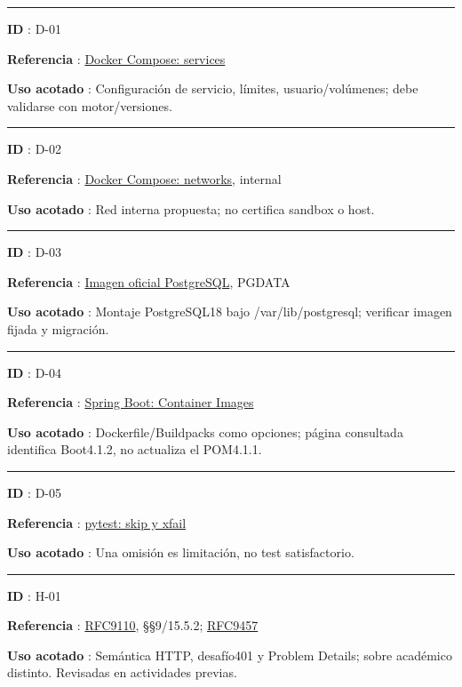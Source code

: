 \documentclass[12pt,a4paper]{report}
\begin{document}
\medskip\hrule\medskip

\textbf{ID }: D-01

\textbf{Referencia
}: \href{https://docs.docker.com/reference/compose-file/services/}{Docker
Compose: services}

\textbf{Uso acotado }: Configuración de servicio, límites,
usuario/volúmenes; debe validarse con motor/versiones.

\medskip\hrule\medskip

\textbf{ID }: D-02

\textbf{Referencia
}: \href{https://docs.docker.com/reference/compose-file/networks/}{Docker
Compose: networks}, internal

\textbf{Uso acotado }: Red interna propuesta; no certifica sandbox o
host.

\medskip\hrule\medskip

\textbf{ID }: D-03

\textbf{Referencia
}: \href{https://raw.githubusercontent.com/docker-library/docs/master/postgres/README.md}{Imagen
oficial PostgreSQL}, PGDATA

\textbf{Uso acotado }: Montaje PostgreSQL18 bajo /var/lib/postgresql;
verificar imagen fijada y migración.

\medskip\hrule\medskip

\textbf{ID }: D-04

\textbf{Referencia
}: \href{https://docs.spring.io/spring-boot/reference/packaging/container-images/index.html}{Spring
Boot: Container Images}

\textbf{Uso acotado }: Dockerfile/Buildpacks como opciones; página
consultada identifica Boot4.1.2, no actualiza el POM4.1.1.

\medskip\hrule\medskip

\textbf{ID }: D-05

\textbf{Referencia
}: \href{https://docs.pytest.org/en/stable/how-to/skipping.html}{pytest:
skip y xfail}

\textbf{Uso acotado }: Una omisión es limitación, no test satisfactorio.

\medskip\hrule\medskip

\textbf{ID }: H-01

\textbf{Referencia
}: \href{https://www.rfc-editor.org/rfc/rfc9110.html}{RFC9110},
§§9/15.5.2; \href{https://www.rfc-editor.org/rfc/rfc9457.html}{RFC9457}

\textbf{Uso acotado }: Semántica HTTP, desafío401 y Problem Details;
sobre académico distinto. Revisadas en actividades previas.
\end{document}
